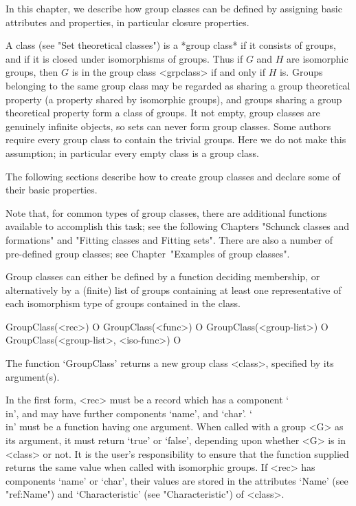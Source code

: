 
In this chapter, we describe how group classes can be defined by assigning
basic attributes and properties, in particular closure properties. 

A class (see "Set theoretical classes") is a *group class* if it consists of
groups, and if it is closed under isomorphisms of groups. Thus if $G$ and
$H$ are isomorphic groups,  then $G$ is in the group class <grpclass> if and
only if
$H$ is. Groups belonging to the same group class may be regarded as sharing
a group theoretical property (a property shared by isomorphic groups), and
groups sharing a group theoretical property form a class of groups. It
not empty, group classes are genuinely infinite objects, so {\GAP} sets can
never form group classes. Some authors require every group class to contain
the trivial groups. Here we do not make this assumption; in particular every
empty class is a group class.


The following sections describe how to create group classes and
declare some of their basic properties. 

Note that,
for common types of group classes, there are additional functions available
to accomplish this task; see the following Chapters 
"Schunck classes and formations" and "Fitting classes and Fitting sets". 
There are also a number of pre-defined group classes; see Chapter~"Examples of
group classes".


\null


Group classes can either be defined by a function deciding membership, or
alternatively by a (finite) list of groups containing at least one
representative of each isomorphism type of groups contained in the class.

\>GroupClass(<rec>) O
\>GroupClass(<func>) O
\>GroupClass(<group-list>) O
\>GroupClass(<group-list>, <iso-func>) O

The function `GroupClass' returns a new group class <class>, specified by its
argument(s).

In the first form, <rec> must be a record which has a component `\\in', and may have
further components `name', and  `char'. `\\in' must be a function having one argument.
When called with a group <G> as its argument, it must return `true' or `false',
depending upon whether <G> is in <class> or not. It is the user's
responsibility to ensure that the function supplied returns the same value
when called with isomorphic groups. If <rec> has components  `name' or 
`char', their values are stored in the attributes `Name' (see "ref:Name")
and `Characteristic' (see "Characteristic") of <class>.

